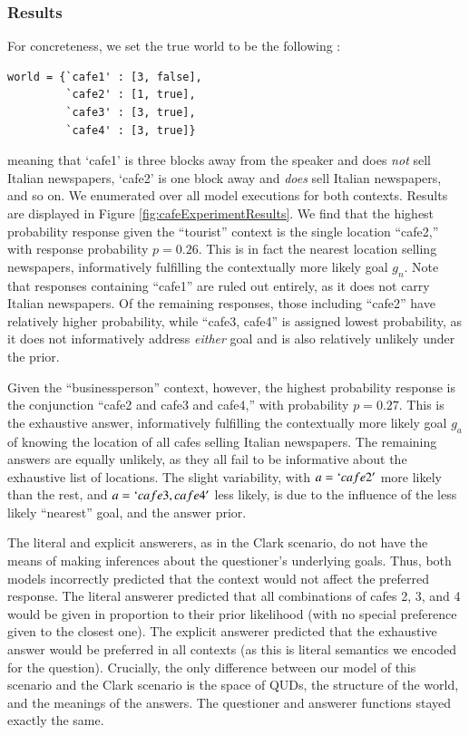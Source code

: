 \documentclass[12pt, floatsintext, jou]{apa6}
\begin{document}
\subsubsection{Results}

For concreteness, we set the true world to be the following :

\begin{lstlisting}
world = {`cafe1' : [3, false],
         `cafe2' : [1, true],
         `cafe3' : [3, true],
         `cafe4' : [3, true]}
\end{lstlisting}
meaning that `cafe1' is three blocks away from the speaker and does \emph{not} sell Italian newspapers, `cafe2' is one block away and \emph{does} sell Italian newspapers, and so on. We enumerated over all model executions for both contexts. Results are displayed in Figure \ref{fig:cafeExperimentResults}. We find that the highest probability response given the ``tourist'' context is the single location ``cafe2,'' with response probability $p = 0.26$. This is in fact the nearest location selling newspapers, informatively fulfilling the contextually more likely goal $g_n$. Note that responses containing ``cafe1'' are ruled out entirely, as it does not carry Italian newspapers. Of the remaining responses, those including ``cafe2'' have relatively higher probability, while ``cafe3, cafe4'' is assigned lowest probability, as it does not informatively address \emph{either} goal and is also relatively unlikely under the prior. 

Given the ``businessperson'' context, however, the highest probability response is the conjunction ``cafe2 and cafe3 and cafe4,'' with probability $p = 0.27$. This is the exhaustive answer, informatively fulfilling the contextually more likely goal $g_a$ of knowing the location of all cafes selling Italian newspapers. The remaining answers are equally unlikely, as they all fail to be informative about the exhaustive list of locations. The slight variability, with $a = `cafe2'$ more likely than the rest, and $a = `cafe3, cafe4'$ less likely, is due to the influence of the less likely ``nearest'' goal, and the answer prior.

The literal and explicit answerers, as in the Clark scenario, do not have the means of making inferences about the questioner's underlying goals. Thus, both models incorrectly predicted that the context would not affect the preferred response. The literal answerer predicted that all combinations of cafes 2, 3, and 4 would be given in proportion to their prior likelihood (with no special preference given to the closest one). The explicit answerer predicted that the exhaustive answer would be preferred in all contexts (as this is literal semantics we encoded for the question).  Crucially, the only difference between our model of this scenario and the Clark scenario is the space of QUDs, the structure of the world, and the meanings of the answers. The questioner and answerer functions stayed exactly the same.
\end{document}
